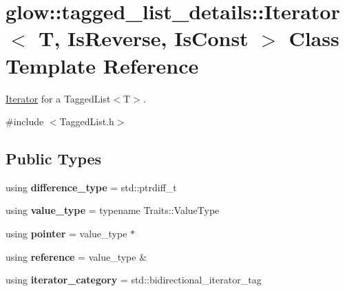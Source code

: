 \hypertarget{classglow_1_1tagged__list__details_1_1_iterator}{}\section{glow\+:\+:tagged\+\_\+list\+\_\+details\+:\+:Iterator$<$ T, Is\+Reverse, Is\+Const $>$ Class Template Reference}
\label{classglow_1_1tagged__list__details_1_1_iterator}


\hyperlink{classglow_1_1tagged__list__details_1_1_iterator}{Iterator} for a Tagged\+List$<$\+T$>$.  




{\ttfamily \#include $<$Tagged\+List.\+h$>$}

\subsection*{Public Types}
\begin{DoxyCompactItemize}
\item 
\mbox{\label{classglow_1_1tagged__list__details_1_1_iterator_a7866f29c844d64ea8076bd87d9224fcf}} 
using {\bfseries difference\+\_\+type} = std\+::ptrdiff\+\_\+t
\item 
\mbox{\label{classglow_1_1tagged__list__details_1_1_iterator_aba945697049bd97d41572ba7be30170d}} 
using {\bfseries value\+\_\+type} = typename Traits\+::\+Value\+Type
\item 
\mbox{\label{classglow_1_1tagged__list__details_1_1_iterator_af5d5a738b64955f1a59281b6f2287031}} 
using {\bfseries pointer} = value\+\_\+type $\ast$
\item 
\mbox{\label{classglow_1_1tagged__list__details_1_1_iterator_a695cf105911cfa278c927983c888c675}} 
using {\bfseries reference} = value\+\_\+type \&
\item 
\mbox{\label{classglow_1_1tagged__list__details_1_1_iterator_a3c95fd157513a909fdc4b0c6d499cb2f}} 
using {\bfseries iterator\+\_\+category} = std\+::bidirectional\+\_\+iterator\+\_\+tag
\end{DoxyCompactItemize}
